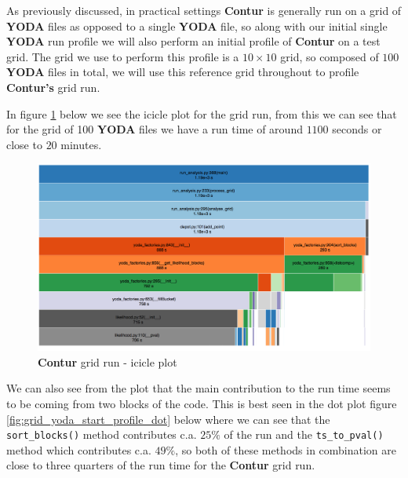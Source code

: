 As previously discussed, in practical settings \textbf{Contur} is generally run on a grid of \textbf{YODA} files as opposed to a single \textbf{YODA} file, so along with our initial single \textbf{YODA} run profile we will also perform an initial profile of \textbf{Contur} on a test grid. The grid we use to perform this profile is a $10 \times 10 $ grid, so composed of $100$ \textbf{YODA} files in total, we will use this reference grid throughout to profile \textbf{Contur's} grid run.

In figure \ref{fig:grid_yoda_start_profile} below we see the icicle plot for the grid run, from this we can see that for the grid of 100 \textbf{YODA} files we have a run time of around $1100$ seconds or close to $20$ minutes. 
\begin{figure}[H]
\centering
\includegraphics[scale=0.30]{plots/initial_contur_grid_profile_two.png}
\caption{\textbf{Contur} grid run - icicle plot}
\label{fig:grid_yoda_start_profile}
\end{figure}

We can also see from the plot that the main contribution to the run time seems to be coming from two blocks of the code. This is best seen in the dot plot figure \ref{fig:grid_yoda_start_profile_dot} below where we can see that the \texttt{sort\_blocks()} method contributes c.a. $25\%$ of the run and the \texttt{ts\_to\_pval()} method which contributes c.a. $49\%$, so both of these methods in combination are close to three quarters of the run time for the \textbf{Contur} grid run.

